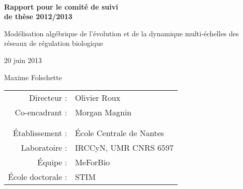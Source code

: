 
\thispagestyle{empty}

~
\vfill
{\Huge
\begin{center}
\textbf{Rapport pour le comité de suivi\\de thèse 2012/2013}

\vspace{1cm}

\LARGE
Modélisation algébrique de l'évolution et de la dynamique multi-échelles des réseaux de régulation biologique

\vspace{2cm}

\normalsize
20 juin 2013

\vspace{1cm}

\Large
Maxime Folschette

\vspace{2cm}

\normalsize
\begin{tabular}{rl}
  Directeur :&Olivier Roux\\
  Co-encadrant :&Morgan Magnin\\
  &\\
  &\\
  Établissement :&École Centrale de Nantes\\
  Laboratoire :&IRCCyN, UMR CNRS 6597\\
  Équipe :&MeForBio\\
  École doctorale :&STIM
\end{tabular}

\end{center}

\vspace{2cm}
}
